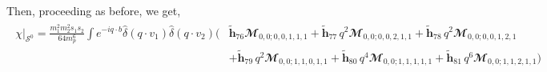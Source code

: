 Then, proceeding as before, we get, 
\begin{align}
    \begin{split}
        \chi\Big|_{\mathcal{S}^0}= \frac{m_1^2 m_2^2 s_1 s_2}{64 m_p^6}\int e^{-i q\cdot b}\hat\delta(q\cdot v_1)\hat\delta(q\cdot v_2)\Bigg(&\boldsymbol{\tilde h}_{76}\mathbfcal{M}_{0,0;0,0,1,1,1}+\boldsymbol{\tilde h}_{77}\,q^2\mathbfcal{M}_{0,0;0,0,2,1,1}+\boldsymbol{\tilde h}_{78}\,q^2\mathbfcal{M}_{0,0;0,0,1,2,1}\\ &+\boldsymbol{\tilde h}_{79}\,q^2\mathbfcal{M}_{0,0;1,1,0,1,1}+\boldsymbol{\tilde h}_{80}\,q^4\mathbfcal{M}_{0,0;1,1,1,1,1}+\boldsymbol{\tilde h}_{81}\,q^6\mathbfcal{M}_{0,0;1,1,2,1,1}\Bigg)
    \end{split}
\end{align}
